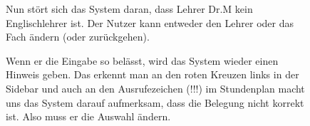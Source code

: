 \documentclass{swp1}
\begin{document}
\begin{figure}
\caption{Nun stört sich das System daran, dass Lehrer Dr.M kein Englischlehrer ist. Der Nutzer kann entweder den Lehrer oder das Fach ändern (oder zurückgehen). }
\label{ab10}
\end{figure}

\begin{figure}
\caption{Wenn er die Eingabe so belässt, wird das System wieder einen Hinweis geben. Das erkennt man an den roten Kreuzen links in der Sidebar und auch an den Ausrufezeichen (!!!) im Stundenplan macht uns das System darauf aufmerksam, dass die Belegung nicht korrekt ist. Also muss er die Auswahl ändern.}
\label{ab11}
\end{figure}
\end{document}
